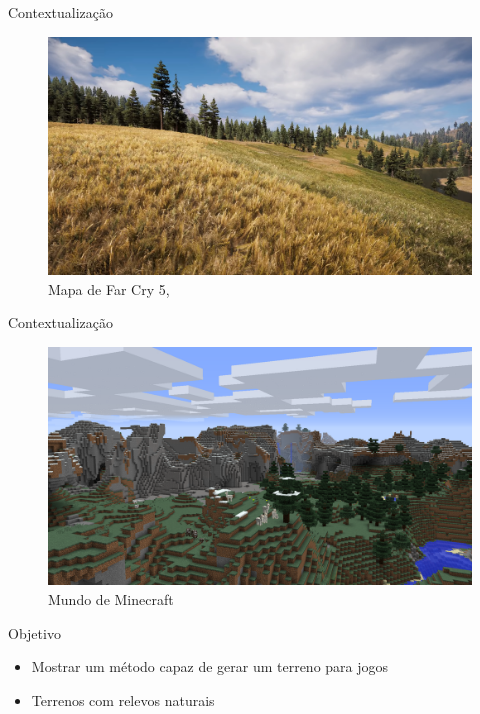 \begin{frame}{Contextualização}
    \begin{figure}
		\centering
        \includegraphics[width=.8\textwidth]{img/intro/fc5terrain.png}
        \caption{Mapa de \alert{Far Cry 5}, \cite{Carrier2018farcry5}}
    \end{figure}
\end{frame}

\begin{frame}{Contextualização}
    \begin{figure}
		\centering
        \includegraphics[width=.8\textwidth]{img/intro/mineExtremeHills.png}
        \caption{Mundo de \alert{Minecraft}}
    \end{figure}  
\end{frame}

\begin{frame}{Objetivo}
    \begin{itemize}
        \item Mostrar um método capaz de gerar um terreno para jogos
        \item Terrenos com relevos \alert{naturais}
    \end{itemize}
\end{frame}